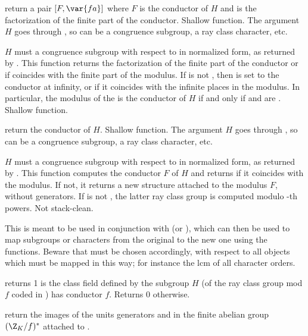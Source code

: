 return a pair $[F,\var{fa}]$ where $F$ is the conductor of $H$ and 
is the factorization of the finite part of the conductor. Shallow function.
The argument $H$ goes through , so can be a
congruence subgroup, a ray class character, etc.

$H$ must a congruence subgroup with respect to  in normalized form,
as returned by . This function returns the
factorization  of the finite part of the conductor or  if
 coincides with the finite part of the  modulus. If
 is not , then  is set to the conductor at
infinity, or  if it coincides with the infinite places in the
 modulus. In particular, the modulus of the  is the
conductor of $H$ if and only if  and  are .
Shallow function.

 return the conductor of $H$.
Shallow function. The argument $H$ goes through ,
so can be a congruence subgroup, a ray class character, etc.

 $H$ must a congruence
subgroup with respect to  in normalized form, as returned by
. This function computes the conductor $F$ of
$H$ and returns  if it coincides with the  modulus.
If not, it returns a new  structure attached to the modulus $F$,
without generators. If  is not , the latter ray class
group is computed modulo -th powers.
Not stack-clean.

This is meant to be used in conjunction with  (or
), which can then be used to map subgroups or characters
from the original  to the new one using the 
functions. Beware that  must be chosen accordingly, with respect to
all objects which must be mapped in this way; for instance the lcm of all
character orders.

 returns 1 is the class field
defined by the subgroup $H$ (of the ray class group mod $f$ coded in )
has conductor $f$. Returns 0 otherwise.

 return the images of the units
generators  and  in the finite abelian group
$(\Z_K/f)^*$ attached to .

